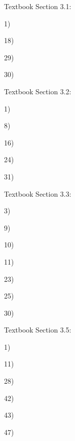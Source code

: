 \documentclass{article}
\begin{document}
Textbook Section 3.1:

1) 

18) 

29) 

30) 


Textbook Section 3.2:

1) 

8) 

16) 

24) 

31) 


Textbook Section 3.3:

3) 

9) 

10) 

11) 

23) 

25) 

30) 


Textbook Section 3.5:

1) 

11) 

28) 

42) 

43) 

47) 
\end{document}
